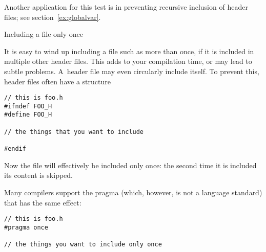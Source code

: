 Another application for this test is in preventing recursive inclusion
of header files; see section~\ref{ex:globalvar}.


 {Including a file only once}

It is easy to wind up including a file such as  more than
once, if it is included in multiple other header files. This adds to
your compilation time, or may lead to subtle problems. A~header file
may even circularly include itself. To prevent this, header files
often have a structure%
\begin{lstlisting}
// this is foo.h
#ifndef FOO_H
#define FOO_H

// the things that you want to include

#endif
\end{lstlisting}
Now the file will effectively be included only once: the second time
it is included its content is skipped.

Many compilers support the pragma
%
(which, however, is not a language standard) that has the same
effect:
\begin{lstlisting}
// this is foo.h
#pragma once

// the things you want to include only once
\end{lstlisting}

